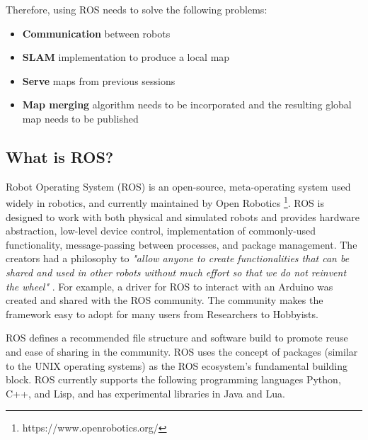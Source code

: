 Therefore, using ROS needs to solve the following problems:

\begin{itemize}
    \item \textbf{Communication} between robots
    \item \textbf{SLAM} implementation to produce a local map
    \item \textbf{Serve} maps from previous sessions
    \item \textbf{Map merging} algorithm needs to be incorporated and the resulting global map needs to be published
\end{itemize}


\subsection{What is ROS?}

Robot Operating System (ROS) is an open-source, meta-operating system used widely in robotics, and currently maintained by Open Robotics \footnote{https://www.openrobotics.org/}. ROS is designed to work with both physical and simulated robots and provides hardware abstraction, low-level device control, implementation of commonly-used functionality, message-passing between processes, and package management. The creators had a philosophy to \textit{"allow anyone to create functionalities that can be shared and used in other robots without much effort so that we do not reinvent the wheel"} \cite{Quigley2009}. For example, a driver for ROS to interact with an Arduino was created and shared with the ROS community. The community makes the framework easy to adopt for many users from Researchers to Hobbyists.



ROS defines a recommended file structure and software build to promote reuse and ease of sharing in the community. ROS uses the concept of packages (similar to the UNIX operating systems) as the ROS ecosystem's fundamental building block. ROS currently supports the following programming languages Python, C++, and Lisp, and has experimental libraries in Java and Lua.

